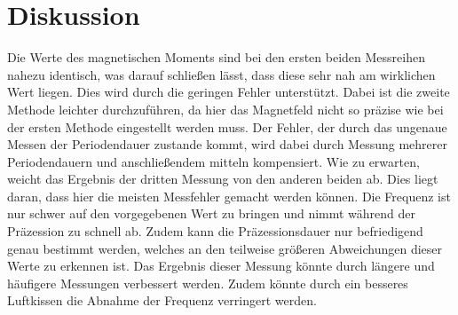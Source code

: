 
\section{Diskussion}
\label{sec:Diskussion}

Die Werte des magnetischen Moments sind bei den ersten beiden Messreihen nahezu identisch, was darauf schließen lässt, dass diese sehr nah am wirklichen Wert liegen. Dies wird durch die geringen Fehler unterstützt. Dabei ist die zweite Methode leichter durchzuführen, da hier das Magnetfeld nicht so präzise wie bei der ersten Methode eingestellt werden muss. Der Fehler, der durch das ungenaue Messen der Periodendauer zustande kommt, wird dabei durch Messung mehrerer Periodendauern und anschließendem mitteln kompensiert.\newline 
Wie zu erwarten, weicht das Ergebnis der dritten Messung von den anderen beiden ab. Dies liegt daran, dass hier die meisten Messfehler gemacht werden können. Die Frequenz ist nur schwer auf den vorgegebenen Wert zu bringen und nimmt während der Präzession zu schnell ab. Zudem kann die Präzessionsdauer nur befriedigend genau bestimmt werden, welches an den teilweise größeren Abweichungen dieser Werte zu erkennen ist. Das Ergebnis dieser Messung könnte durch längere und häufigere Messungen verbessert werden. Zudem könnte durch ein besseres Luftkissen die Abnahme der Frequenz verringert werden. 